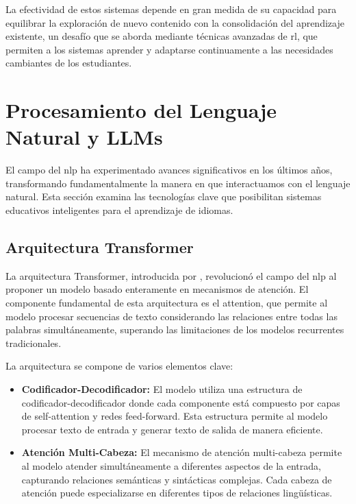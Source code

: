 La efectividad de estos sistemas depende en gran medida de su capacidad para equilibrar la exploración de nuevo contenido con la consolidación del aprendizaje existente, un desafío que se aborda mediante técnicas avanzadas de \gls{rl}, que permiten a los sistemas aprender y adaptarse continuamente a las necesidades cambiantes de los estudiantes.

\section{Procesamiento del Lenguaje Natural y LLMs}

El campo del \gls{nlp} ha experimentado avances significativos en los últimos años, transformando fundamentalmente la manera en que interactuamos con el lenguaje natural. Esta sección examina las tecnologías clave que posibilitan sistemas educativos inteligentes para el aprendizaje de idiomas.

\subsection{Arquitectura Transformer}

La arquitectura Transformer, introducida por \cite{vaswani2017attention}, revolucionó el campo del \gls{nlp} al proponer un modelo basado enteramente en mecanismos de atención. El componente fundamental de esta arquitectura es el \gls{attention}, que permite al modelo procesar secuencias de texto considerando las relaciones entre todas las palabras simultáneamente, superando las limitaciones de los modelos recurrentes tradicionales.

La arquitectura se compone de varios elementos clave:

\begin{itemize}
  \item \textbf{Codificador-Decodificador:} El modelo utiliza una estructura de codificador-decodificador donde cada componente está compuesto por capas de \gls{self-attention} y redes \gls{feed-forward}. Esta estructura permite al modelo procesar texto de entrada y generar texto de salida de manera eficiente.

  \item \textbf{Atención Multi-Cabeza:} El mecanismo de atención multi-cabeza permite al modelo atender simultáneamente a diferentes aspectos de la entrada, capturando relaciones semánticas y sintácticas complejas. Cada cabeza de atención puede especializarse en diferentes tipos de relaciones lingüísticas.
\end{itemize}

